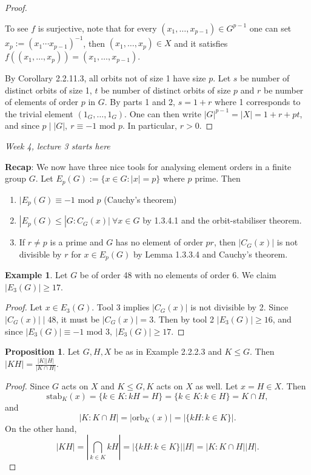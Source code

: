 \documentclass[a4paper]{article}
\newcommand{\orb}{\text{orb}}
\newcommand{\stab}{\text{stab}}
\newcommand{\Mod}{\text{ mod }}
\theoremstyle{definition}
\newtheorem{prop}[defn]{Proposition}
\newtheorem{example}[defn]{Example}
\begin{document}
\begin{proof}
\begin{enumerate}
\[\]
To see $f$ is surjective, note that for every $(x_1,\ldots,x_{p-1})\in G^{p-1}$ one can set $x_p:=(x_1\cdots x_{p-1})^{-1}$, then $(x_1,\ldots,x_p)\in X$ and it satisfies $f((x_1,\ldots,x_p))=(x_1,\ldots,x_{p-1})$.
\end{enumerate}
By Corollary 2.2.11.3, all orbits not of size 1 have size $p$. Let $s$ be number of distinct orbits of size 1, $t$ be number of distinct orbits of size $p$ and $r$ be number of elements of order $p$ in $G$. By parts 1 and 2, $s=1+r$ where 1 corresponds to the trivial element $(1_G,\ldots,1_G)$. One can then write $|G|^{p-1}=|X|=1+r+pt$, and since $p\mid |G|,\ r\equiv -1\Mod p$. In particular, $r>0$.
\end{proof}

\begin{flushright}
\textit{Week 4, lecture 3 starts here}
\end{flushright}

\textbf{Recap}: We now have three nice tools for analysing element orders in a finite group $G$. Let $E_p(G):=\{x\in G:|x|=p\}$ where $p$ prime. Then
\begin{enumerate}
\item $|E_p(G)\equiv -1\Mod p$ (Cauchy's theorem)
\item $|E_p(G)\leq |G:C_G(x)| \ \forall x\in G$ by 1.3.4.1 and the orbit-stabiliser theorem.
\item If $r\neq p$ is a prime and $G$ has no element of order $pr$, then $|C_G(x)|$ is not divisible by $r$ for $x\in E_p(G)$ by Lemma 1.3.3.4 and Cauchy's theorem.
\end{enumerate}

\begin{example}
Let $G$ be of order 48 with no elements of order 6. We claim $|E_3(G)|\geq 17$.
\begin{proof}
Let $x\in E_3(G)$. Tool 3 implies $|C_G(x)|$ is not divisible by 2. Since $|C_G(x)|\mid 48$, it must be $|C_G(x)|=3$. Then by tool 2 $|E_3(G)|\geq 16$, and since $|E_3(G)|\equiv -1\Mod 3,\ |E_3(G)|\geq 17$.
\end{proof}
\end{example}

\begin{prop}
Let $G,H,X$ be as in Example 2.2.2.3 and $K\leq G$. Then $|KH|=\frac{|K||H|}{|K\cap H|}$.
\end{prop}
\begin{proof}
Since $G$ acts on $X$ and $K\leq G, K$ acts on $X$ as well. Let $x=H\in X$. Then
\[
\stab_K(x)=\{k\in K:kH=H\}=\{k\in K:k\in H\}=K\cap H,
\]
and
\[
|K:K\cap H|=|\orb_K(x)|=|\{kH:k\in K\}|.
\]
On the other hand,
\[
|KH|=\left|\bigcap_{k\in K} kH\right| = |\{kH:k\in K\}||H|=|K:K\cap H||H|.
\]
\end{proof}
\end{document}
